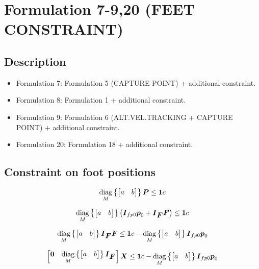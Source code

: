 \section{Formulation 7-9,20 (FEET CONSTRAINT)}


\subsection{Description}
\begin{itemize}
    \item Formulation 7: Formulation 5 (CAPTURE POINT) + additional constraint.
    \item Formulation 8: Formulation 1 + additional constraint.
    \item Formulation 9: Formulation 6 (ALT.VEL.TRACKING + CAPTURE POINT) + additional constraint.
    \item Formulation 20: Formulation 18 + additional constraint.
\end{itemize}



\subsection{Constraint on foot positions}

\begin{equation*}
    \underset{M}{\operatorname{diag}}\left\{\begin{bmatrix} a & b \end{bmatrix}\right\}
    \mbox{\boldmath $P$}
    \le
    \mbox{\boldmath $1$} c
\end{equation*}

\begin{equation*}
    \underset{M}{\operatorname{diag}}\left\{\begin{bmatrix} a & b \end{bmatrix}\right\}
    \left(
        \mbox{\boldmath $I$}_{fp0}
        \mbox{\boldmath $p$}_0
        +
        \mbox{\boldmath $I$}_{\mbox{\boldmath $F$}}
        \mbox{\boldmath $F$}
    \right)
    \le
    \mbox{\boldmath $1$} c
\end{equation*}

\begin{equation*}
    \underset{M}{\operatorname{diag}}\left\{\begin{bmatrix} a & b \end{bmatrix}\right\}
    \mbox{\boldmath $I$}_{\mbox{\boldmath $F$}}
    \mbox{\boldmath $F$}
    \le
    \mbox{\boldmath $1$} c -
    \underset{M}{\operatorname{diag}}\left\{\begin{bmatrix} a & b \end{bmatrix}\right\}
    \mbox{\boldmath $I$}_{fp0}
    \mbox{\boldmath $p$}_0
\end{equation*}


\begin{equation*}
    \begin{bmatrix}
        \mbox{\boldmath $0$} & \underset{M}{\operatorname{diag}}\left\{\begin{bmatrix} a & b \end{bmatrix}\right\} \mbox{\boldmath $I$}_{\mbox{\boldmath $F$}}
    \end{bmatrix}
    \mbox{\boldmath $X$}
    \le
    \mbox{\boldmath $1$} c -
    \underset{M}{\operatorname{diag}}\left\{\begin{bmatrix} a & b \end{bmatrix}\right\}
    \mbox{\boldmath $I$}_{fp0}
    \mbox{\boldmath $p$}_0
\end{equation*}
